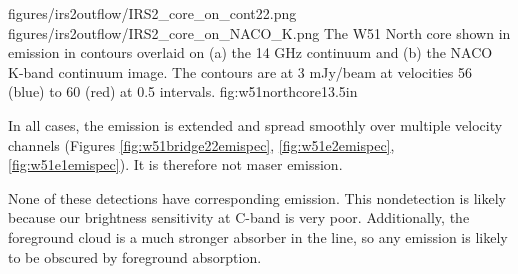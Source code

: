 \FigureTwo
{figures/irs2outflow/IRS2_core_on_cont22.png}
{figures/irs2outflow/IRS2_core_on_NACO_K.png}
{The W51 North core shown in \formaldehyde \twotwo emission in contours
overlaid on (a) the 14 GHz continuum and (b) the NACO K-band continuum image.
The contours are at 3 mJy/beam at velocities 56 (blue) to 60 (red) \kms at 0.5
\kms intervals.
}
{fig:w51northcore}{1}{3.5in}

In all cases, the emission is extended and spread smoothly over multiple
velocity channels (Figures 
\ref{fig:w51bridge22emispec}, \ref{fig:w51e2emispec}, \ref{fig:w51e1emispec}).
It is therefore not maser emission.

None of these detections have corresponding \oneone emission.  This
nondetection is likely because our brightness sensitivity at C-band is very
poor.  Additionally, the foreground cloud is a much stronger absorber in the
\oneone line, so any emission is likely to be obscured by foreground
absorption.





